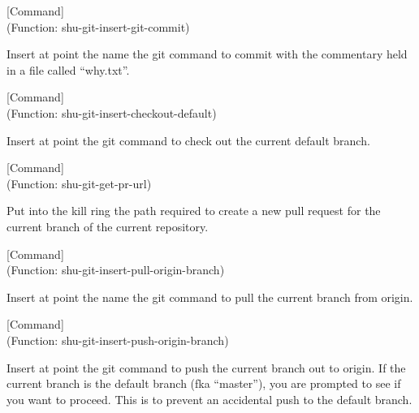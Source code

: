 \vspace{1em}
\noindent
{}
\usebox{\funcname}
 \hfill [Command]\\%
 (Function: shu-git-insert-git-commit)

\begin{doc-string}
Insert at point the name the git command to commit with the commentary held
in a file called ``why.txt''.
\end{doc-string}

\vspace{1em}
\noindent
{}
\usebox{\funcname}
 \hfill [Command]\\%
 (Function: shu-git-insert-checkout-default)

\begin{doc-string}
Insert at point the git command to check out the current default branch.
\end{doc-string}

\vspace{1em}
\noindent
{}
\usebox{\funcname}
 \hfill [Command]\\%
 (Function: shu-git-get-pr-url)

\begin{doc-string}
Put into the kill ring the path required to create a new pull request for
the current branch of the current repository.
\end{doc-string}

\vspace{1em}
\noindent
{}
\usebox{\funcname}
 \hfill [Command]\\%
 (Function: shu-git-insert-pull-origin-branch)

\begin{doc-string}
Insert at point the name the git command to pull the current branch from
origin.
\end{doc-string}

\vspace{1em}
\noindent
{}
\usebox{\funcname}
 \hfill [Command]\\%
 (Function: shu-git-insert-push-origin-branch)

\begin{doc-string}
Insert at point the git command to push the current branch out to origin.  If
the current branch is the default branch (fka ``master''), you are prompted to
see if you want to proceed.  This is to prevent an accidental push to the
default branch.
\end{doc-string}

